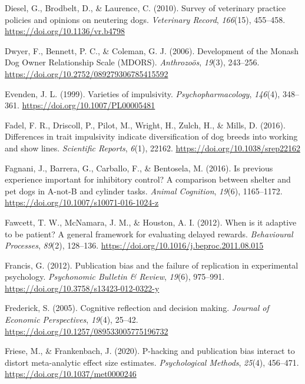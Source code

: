 \documentclass[
  pub,floatsintext]{apa6}
\newlength{\cslhangindent}
\newlength{\cslentryspacingunit} %
\newenvironment{CSLReferences}[2] %
 {%
  \setlength{\parindent}{0pt}
  \ifodd #1
  \let\oldpar\par
  \def\par{\hangindent=\cslhangindent\oldpar}
  \fi
  \setlength{\parskip}{#2\cslentryspacingunit}
 }%
 {}
\begin{document}
\begin{CSLReferences}{1}{0}
\leavevmode{}%
Diesel, G., Brodbelt, D., \& Laurence, C. (2010). Survey of veterinary practice policies and opinions on neutering dogs. \emph{Veterinary Record}, \emph{166}(15), 455--458. \url{https://doi.org/10.1136/vr.b4798}

\leavevmode{}%
Dwyer, F., Bennett, P. C., \& Coleman, G. J. (2006). Development of the {Monash Dog Owner Relationship Scale} ({MDORS}). \emph{Anthrozoös}, \emph{19}(3), 243--256. \url{https://doi.org/10.2752/089279306785415592}

\leavevmode{}%
Evenden, J. L. (1999). Varieties of impulsivity. \emph{Psychopharmacology}, \emph{146}(4), 348--361. \url{https://doi.org/10.1007/PL00005481}

\leavevmode{}%
Fadel, F. R., Driscoll, P., Pilot, M., Wright, H., Zulch, H., \& Mills, D. (2016). Differences in trait impulsivity indicate diversification of dog breeds into working and show lines. \emph{Scientific Reports}, \emph{6}(1), 22162. \url{https://doi.org/10.1038/srep22162}

\leavevmode{}%
Fagnani, J., Barrera, G., Carballo, F., \& Bentosela, M. (2016). Is previous experience important for inhibitory control? {A} comparison between shelter and pet dogs in {A-not-B} and cylinder tasks. \emph{Animal Cognition}, \emph{19}(6), 1165--1172. \url{https://doi.org/10.1007/s10071-016-1024-z}

\leavevmode{}%
Fawcett, T. W., McNamara, J. M., \& Houston, A. I. (2012). When is it adaptive to be patient? {A} general framework for evaluating delayed rewards. \emph{Behavioural Processes}, \emph{89}(2), 128--136. \url{https://doi.org/10.1016/j.beproc.2011.08.015}

\leavevmode{}%
Francis, G. (2012). Publication bias and the failure of replication in experimental psychology. \emph{Psychonomic Bulletin \& Review}, \emph{19}(6), 975--991. \url{https://doi.org/10.3758/s13423-012-0322-y}

\leavevmode{}%
Frederick, S. (2005). Cognitive reflection and decision making. \emph{Journal of Economic Perspectives}, \emph{19}(4), 25--42. \url{https://doi.org/10.1257/089533005775196732}

\leavevmode{}%
Friese, M., \& Frankenbach, J. (2020). P-hacking and publication bias interact to distort meta-analytic effect size estimates. \emph{Psychological Methods}, \emph{25}(4), 456--471. \url{https://doi.org/10.1037/met0000246}


\end{CSLReferences}
\end{document}
